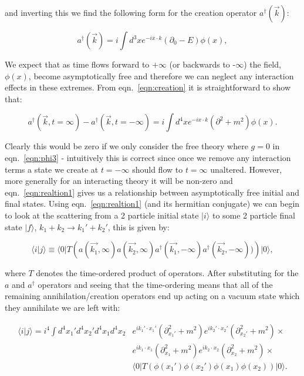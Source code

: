 	and inverting this we find the following form for the creation operator $a^\dagger(\vec{k})$:

	\begin{equation}
		a^\dagger(\vec{k}) = i\int d^3xe^{-ix\cdot k}(\partial_0 - E)\phi(x),
		\label{eqn:creation}
	\end{equation}

	We expect that as time flows forward to $+\infty$ (or backwards to -$\infty$) the field, $\phi(x)$, become asymptotically
	free and therefore we can neglect any interaction effects in these extremes.  From eqn.~\eqref{eqn:creation} it is
	straightforward to show that:

	\begin{equation}
		a^\dagger(\vec{k}, t=\infty) - a^\dagger(\vec{k}, t=-\infty) = i\int d^4x e^{-ix\cdot k}(\partial^2 + m^2)\phi(x).
		\label{eqn:realtion1}
	\end{equation}

	Clearly this would be zero if we only consider the free theory where $g=0$ in eqn.~\eqref{eqn:phi3} - intuitively this
	is correct since once we remove any interaction terms a state we create at $t=-\infty$ should flow to $t=\infty$ unaltered.
	However, more generally for an interacting theory it will be non-zero and eqn.~\eqref{eqn:realtion1} gives us a relationship
	between asymptotically free initial and final states.  Using eqn.~\eqref{eqn:realtion1} (and its hermitian conjugate) we can
	begin to look at the scattering from a 2 particle initial state $|i\rangle$ to some 2 particle final state $|f\rangle$,
	$k_1+k_2\rightarrow k_1'+k_2'$, this is given by:

	\begin{equation}
		\langle i|j\rangle\equiv\langle0|T\left(a(\vec{k_1}, \infty)a(\vec{k_2}, \infty)a^\dagger(\vec{k_1}, -\infty)a^\dagger(\vec{k_2}, -\infty))\right)|0\rangle,
	\end{equation}

	where $T$ denotes the time-ordered product of operators.  After substituting
	for the $a$ and $a^\dagger$ operators and seeing that the time-ordering means that all of the remaining annihilation/creation
	operators end up acting on a vacuum state which they annihilate we are left with:

	\begin{align*}
		\langle i|j\rangle = i^4\int d^4x_1'd^4x_2'd^4x_1d^4x_2&e^{ik_1'\cdot x_1'}(\partial^2_{x_1'} + m^2)
		e^{ik_2'\cdot x_2'}(\partial^2_{x_2'} + m^2)\times\\
		&e^{ik_1 \cdot x_1 }(\partial^2_{x_1 } + m^2)e^{ik_2 \cdot x_2 }(\partial^2_{x_2 } + m^2)\times\\
		&\langle0|T\left(\phi(x_1')\phi(x_2')\phi(x_1)\phi(x_2)\right)|0\rangle.
	\end{align*}

